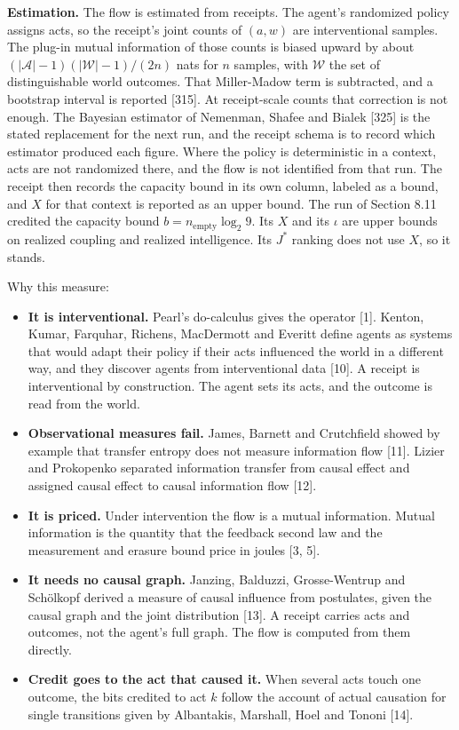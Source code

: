 \documentclass[
  10pt,
]{article}
\providecommand{\tightlist}{%
  \setlength{\itemsep}{0pt}\setlength{\parskip}{0pt}}
\begin{document}
\textbf{Estimation.} The flow is estimated from receipts. The agent's
randomized policy assigns acts, so the receipt's joint counts of
\((a, w)\) are interventional samples. The plug-in mutual information of
those counts is biased upward by about
\((|\mathcal{A}|-1)(|\mathcal{W}|-1)/(2n)\) nats for \(n\) samples, with
\(\mathcal{W}\) the set of distinguishable world outcomes. That
Miller-Madow term is subtracted, and a bootstrap interval is reported
{[}315{]}. At receipt-scale counts that correction is not enough. The
Bayesian estimator of Nemenman, Shafee and Bialek {[}325{]} is the
stated replacement for the next run, and the receipt schema is to record
which estimator produced each figure. Where the policy is deterministic
in a context, acts are not randomized there, and the flow is not
identified from that run. The receipt then records the capacity bound in
its own column, labeled as a bound, and \(X\) for that context is
reported as an upper bound. The run of Section 8.11 credited the
capacity bound \(b = n_{\mathrm{empty}}\log_2 9\). Its \(X\) and its
\(\iota\) are upper bounds on realized coupling and realized
intelligence. Its \(J^*\) ranking does not use \(X\), so it stands.

Why this measure:

\begin{itemize}
\tightlist
\item
  \textbf{It is interventional.} Pearl's do-calculus gives the operator
  {[}1{]}. Kenton, Kumar, Farquhar, Richens, MacDermott and Everitt
  define agents as systems that would adapt their policy if their acts
  influenced the world in a different way, and they discover agents from
  interventional data {[}10{]}. A receipt is interventional by
  construction. The agent sets its acts, and the outcome is read from
  the world.
\item
  \textbf{Observational measures fail.} James, Barnett and Crutchfield
  showed by example that transfer entropy does not measure information
  flow {[}11{]}. Lizier and Prokopenko separated information transfer
  from causal effect and assigned causal effect to causal information
  flow {[}12{]}.
\item
  \textbf{It is priced.} Under intervention the flow is a mutual
  information. Mutual information is the quantity that the feedback
  second law and the measurement and erasure bound price in joules {[}3,
  5{]}.
\item
  \textbf{It needs no causal graph.} Janzing, Balduzzi, Grosse-Wentrup
  and Schölkopf derived a measure of causal influence from postulates,
  given the causal graph and the joint distribution {[}13{]}. A receipt
  carries acts and outcomes, not the agent's full graph. The flow is
  computed from them directly.
\item
  \textbf{Credit goes to the act that caused it.} When several acts
  touch one outcome, the bits credited to act \(k\) follow the account
  of actual causation for single transitions given by Albantakis,
  Marshall, Hoel and Tononi {[}14{]}.
\end{itemize}
\end{document}
